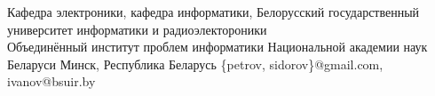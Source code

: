 \documentclass[a4paper,10pt,twoside]{article}
\begin{document}
\setcounter{section}{0}
\setcounter{figure}{0}
\setcounter{table}{0}
\setcounter{equation}{0}
\setcounter{secnumdepth}{1}
\setcounter{secnumdepth}{1}




%
%

{Кафедра электроники, кафедра информатики, Белорусский государственный университет информатики и радиоэлектороники\\Объединённый институт проблем информатики Национальной академии наук Беларуси} 
{Минск, Республика Беларусь}
{\{petrov, sidorov\}@gmail.com, ivanov@bsuir.by}
\end{document}
